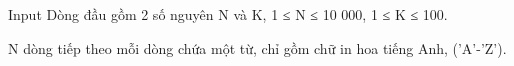 Input
Dòng đầu gồm 2 số nguyên N và K, 1 ≤ N ≤ 10 000, 1 ≤ K ≤ 100.   


   N dòng tiếp theo mỗi dòng chứa một từ, chỉ gồm chữ in hoa tiếng Anh, ('A'-'Z').